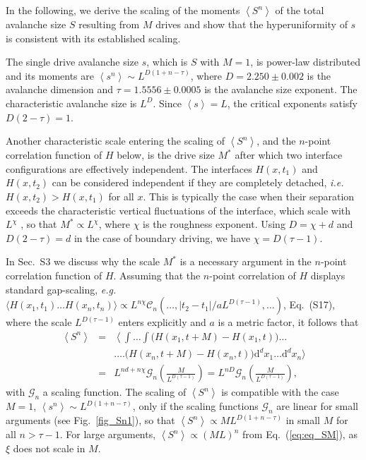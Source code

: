 \documentclass[doublecol]{epl2}
\makeatletter
\newcommand{\ave}[1]{\left\langle{#1}\right\rangle}
\newcommand{\latin}[1]{{\it #1}}
\newcommand{\ie}{\latin{i.e.}\@\xspace}
\newcommand{\eg}{\latin{e.g.}\@\xspace}
\newcommand{\plaind}{\text{d}}
\newcommand{\elabel}[1]{\label{eq:#1}}
\newcommand{\Eref}[1]{Eq.~(\ref{eq:#1})}
\newcommand{\Figref}[1]{Fig.~\ref{fig_#1}}
\newcommand{\bungledXR}[2]{#2}
\makeatother
\begin{document}
In the following, we derive the scaling of the moments $\ave{S^n}$ of the
total avalanche size $S$ resulting from $M$ drives and show that the hyperuniformity
of $s$ is consistent with its established scaling.

The single drive avalanche size $s$, which is $S$ with $M=1$, is power-law distributed \cite{ChristensenETAL:1996, PhysRevE.94.042314,paczuski1996avalanche, pruessner2012self} and its moments are $\ave{s^n}\sim L^{D(1+n-\tau)}$, where $D=2.250\pm0.002$ is the avalanche dimension and $\tau=1.5556\pm0.0005$ \cite{ChristensenETAL:1996,
PhysRevE.94.042314,paczuski1996avalanche} is the avalanche size exponent. The characteristic avalanche size is $L^D$. Since $\ave{s}= L$, the critical exponents satisfy $D(2-\tau)=1$.

Another characteristic scale entering the scaling of $\ave{S^n}$, and the $n$-point correlation function of $H$ below, is the drive size $M^*$ after which two interface configurations are effectively independent. The interfaces $H(x,t_1)$ and $H(x,t_2)$ can be considered independent if they are completely detached, \ie $H(x,t_2)>H(x,t_1)$ for all $x$. This is typically the case when their separation exceeds the characteristic vertical fluctuations of the interface, which scale with $L^{\chi}$ \cite{PhysRevLett.77.111,pruessner2012self}, so that $M^* \propto L^{\chi}$, where $\chi$ is the roughness exponent. Using $D=\chi+d$ \cite{paczuski1996avalanche, PhysRevLett.77.111} and $D(2-\tau)=d$ in the case of boundary driving, we have $\chi=D(\tau-1)$.

% 
In Sec.~S3 we discuss why the scale $M^*$ is a necessary argument in the $n$-point correlation function of $H$. Assuming that the $n$-point correlation of $H$ displays standard gap-scaling, \eg $\langle H(x_1,t_1)\ldots H(x_n,t_n)\rangle\propto L^{n\chi}
\mathcal{C}_n\left(\ldots,|t_2-t_1|/aL^{D(\tau-1)},\ldots\right)$, \bungledXR{\Eref{eq_corr_func2}}{Eq.~(S17)}, where the scale $L^{D(\tau-1)}$ enters explicitly and $a$ is a metric factor, it follows that
\begin{eqnarray}
\ave{S^n} &=& \left\langle\int\ldots\int \big( H(x_1,t+M)-H(x_1,t)\big)\ldots\right.
\elabel{eq_Sn}\\
&&\bigg.\ldots \big( H(x_n,t+M)-H(x_n,t)\big) \plaind^dx_1\ldots\plaind^dx_n \bigg\rangle \nonumber\\
&=& L^{nd+n\chi}\mathcal{G}_n \left(\frac{M}{L^{D(\tau-1)}}\right) = L^{nD}\mathcal{G}_n \left(\frac{M}{L^{D(\tau-1)}}\right),
\nonumber
\end{eqnarray}
with $\mathcal{G}_n$ a scaling function. The scaling of $\ave{S^n}$ is compatible with the case $M=1$, $\ave{s^n}\sim L^{D(1+n-\tau)}$, only if the scaling functions $\mathcal{G}_n$ are linear for small arguments (see \Figref{Sn1}), so that $\ave{S^n}\propto M L^{D(1+n-\tau)}$ in small $M$ for all $n>\tau-1$. For large arguments, $\ave{S^n}\propto (ML)^n$ from \Eref{eq_SM}, as $\xi$ does not scale in $M$.
\end{document}
